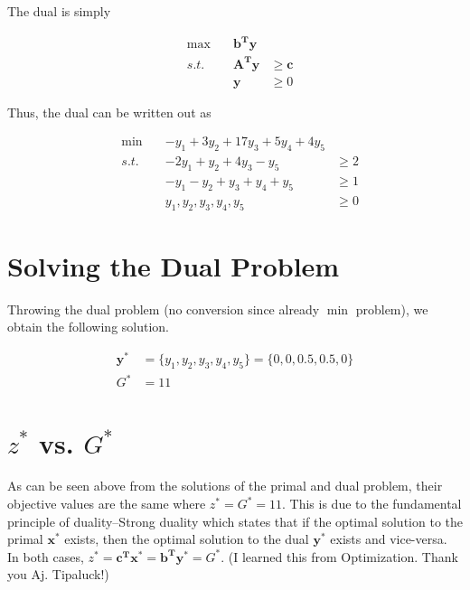 The dual is simply

\begin{equation}
    \begin{aligned}
	& \max\quad& \mathbf{b^T y} & \\
    & s.t.\quad & \mathbf{A^T y} &\geq \mathbf c \\
	&& \mathbf y &\geq 0
    \end{aligned}
\end{equation}

Thus, the dual can be written out as

\begin{equation}
    \begin{aligned}
    & \min\quad& -y_1 +3y_2 +17y_3 +5y_4 +4y_5 & \\
    & s.t.\quad 
        &-2y_1 +y_2 +4y_3 -y_5 &\geq 2 \\
        &&-y_1 -y_2 +y_3 +y_4 +y_5 &\geq 1 \\
        &&y_1, y_2, y_3, y_4, y_5 &\geq 0
    \end{aligned}
\end{equation}

\section{Solving the Dual Problem}

Throwing the dual problem (no conversion since already $\min$ problem), we obtain the following solution.

\begin{equation}
    \begin{aligned}
		\mathbf y^* &= \{y_1, y_2, y_3, y_4, y_5\} = \{0, 0, 0.5, 0.5, 0\} \\
		G^* &= 11
    \end{aligned}
\end{equation}

\section{$z^*$ vs. $G^*$}

As can be seen above from the solutions of the primal and dual problem, their objective values are the same where $z^* = G^* = 11$.
This is due to the fundamental principle of duality--Strong duality which states that if the optimal solution to the primal $\mathbf x^*$ exists, then the optimal solution to the dual $\mathbf y^*$ exists and vice-versa. In both cases, $z^* = \mathbf{c^T x^*} = \mathbf{b^T y^*} = G^*$.
(I learned this from Optimization. Thank you Aj. Tipaluck!)
